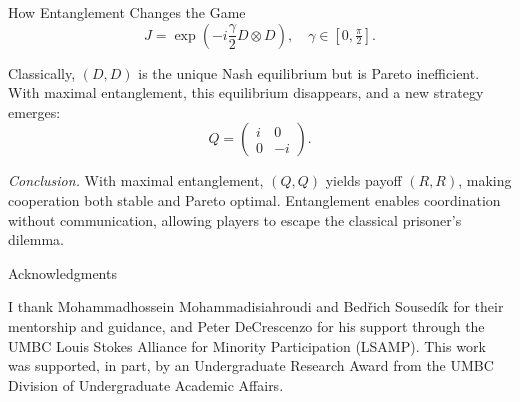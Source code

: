 \documentclass[final]{beamer}
\newlength{\colwidth}
\begin{document}
\begin{frame}[t]
\begin{columns}[t]
\begin{column}{\colwidth}
\begin{block}{How Entanglement Changes the Game}
					\[
					J = \exp\!\left(-i\frac{\gamma}{2}D \otimes D \right),
					\quad
					\gamma \in [0, \tfrac{\pi}{2}].
					\]
					
					\begin{center}
					\end{center}
					
					
					Classically, $(D,D)$ is the unique Nash equilibrium but is Pareto inefficient. With maximal entanglement, this equilibrium disappears, and a new strategy emerges:
					\[
					Q =
					\begin{pmatrix}
						i & 0 \\
						0 & -i
					\end{pmatrix}.
					\]
					
					\textit{Conclusion.} With maximal entanglement, $(Q,Q)$ yields payoff $(R,R)$, making cooperation both stable and Pareto optimal. Entanglement enables coordination without communication, allowing players to escape the classical prisoner’s dilemma.
					
				\end{block}
				
				\begin{block}{Acknowledgments}
					
					I thank Mohammadhossein Mohammadisiahroudi and Bed\v{r}ich Soused\'{i}k for their mentorship and guidance, and Peter DeCrescenzo for his support through the UMBC Louis Stokes Alliance for Minority Participation (LSAMP). This work was supported, in part, by an Undergraduate Research Award from the UMBC Division of Undergraduate Academic Affairs.
					

\end{block}
\end{column}
\end{columns}
\end{frame}
\end{document}
